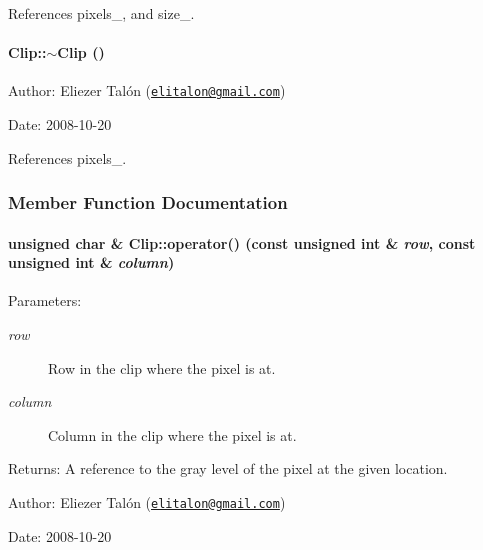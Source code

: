 References pixels\_\-, and size\_\-.\hypertarget{class_clip_88647ed65e3482b5e0533ec98667b0fa}{
\paragraph[$\sim$Clip]{\setlength{\rightskip}{0pt plus 5cm}Clip::$\sim$Clip ()}\hfill}
\label{class_clip_88647ed65e3482b5e0533ec98667b0fa}


\begin{Desc}
\item[Author:]Eliezer Talón (\href{mailto:elitalon@gmail.com}{\tt elitalon@gmail.com}) \end{Desc}
\begin{Desc}
\item[Date:]2008-10-20 \end{Desc}


References pixels\_\-.

\subsubsection{Member Function Documentation}
\hypertarget{class_clip_0f80c2b0f0f177fe9c780c93596f77be}{
\paragraph[operator()]{\setlength{\rightskip}{0pt plus 5cm}unsigned char \& Clip::operator() (const unsigned int \& {\em row}, \/  const unsigned int \& {\em column})}\hfill}
\label{class_clip_0f80c2b0f0f177fe9c780c93596f77be}


\begin{Desc}
\item[Parameters:]
\begin{description}
\item[{\em row}]Row in the clip where the pixel is at. \item[{\em column}]Column in the clip where the pixel is at.\end{description}
\end{Desc}
\begin{Desc}
\item[Returns:]A reference to the gray level of the pixel at the given location.\end{Desc}
\begin{Desc}
\item[Author:]Eliezer Talón (\href{mailto:elitalon@gmail.com}{\tt elitalon@gmail.com}) \end{Desc}
\begin{Desc}
\item[Date:]2008-10-20 \end{Desc}


